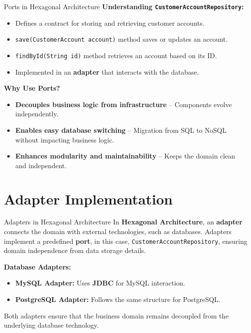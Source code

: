 \documentclass[aspectratio=169, table]{beamer}
\begin{document}
\begin{frame}[fragile]{Ports in Hexagonal Architecture}
	\vspace{20pt}
	\textbf{Understanding \texttt{CustomerAccountRepository}:}
	\begin{itemize}
		\item Defines a contract for storing and retrieving customer accounts.
		\item \texttt{save(CustomerAccount account)} method saves or updates an account.
		\item \texttt{findById(String id)} method retrieves an account based on its ID.
		\item Implemented in an \textbf{adapter} that interacts with the database.
	\end{itemize}
	
	\textbf{Why Use Ports?}
	\begin{itemize}
		\item \textbf{Decouples business logic from infrastructure} – Components evolve independently.
		\item \textbf{Enables easy database switching} – Migration from SQL to NoSQL without impacting business logic.
		\item \textbf{Enhances modularity and maintainability} – Keeps the domain clean and independent.
	\end{itemize}
\end{frame}


\section{Adapter Implementation}

\begin{frame}[fragile]{Adapters in Hexagonal Architecture}
	\vspace{20pt}
	In \textbf{Hexagonal Architecture}, an \textbf{adapter} connects the domain with external technologies, such as databases.  
	Adapters implement a predefined \textbf{port}, in this case, \texttt{CustomerAccountRepository}, ensuring domain independence from data storage details.
	
	\textbf{Database Adapters:}
	\begin{itemize}
		\item \textbf{MySQL Adapter:} Uses \textbf{JDBC} for MySQL interaction.
		\item \textbf{PostgreSQL Adapter:} Follows the same structure for PostgreSQL.
	\end{itemize}
	Both adapters ensure that the business domain remains decoupled from the underlying database technology.
\end{frame}
\end{document}
